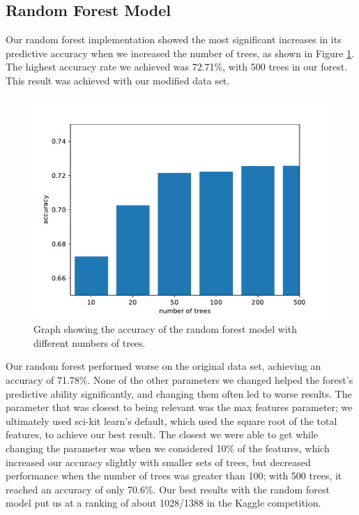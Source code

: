 \documentclass[11pt]{article}
\begin{document}
\subsection{Random Forest Model}
Our random forest implementation showed the most significant increases in its predictive accuracy when we increased the number of trees, as shown in Figure \ref{fig:trees}. The highest accuracy rate
we achieved was 72.71\%, with 500 trees in our forest. This result was achieved with our modified data set.
\begin{figure}[h]
    \centering
    \includegraphics[scale=0.8]{images/trees.pdf}
    \caption{Graph showing the accuracy of the random forest model with different numbers of trees.}
    \label{fig:trees}
\end{figure}

Our random forest performed worse on the original data set,
achieving an accuracy of 71.78\%. None of the other parameters we changed helped the forest's predictive ability significantly, and changing them often led to worse results.
The parameter that was closest to being relevant was the max features parameter; we ultimately used sci-kit learn's default, which used the square root of the total features, to
achieve our best result. The closest we were able to get while changing the parameter was when we considered 10\% of the features, which increased our accuracy slightly with smaller sets of trees, but decreased performance when the number of trees was greater than 100; with 500 trees, it reached an accuracy of only 70.6\%. Our best results with the random forest model put us at a ranking of about 1028/1388 in the Kaggle competition.
\end{document}
